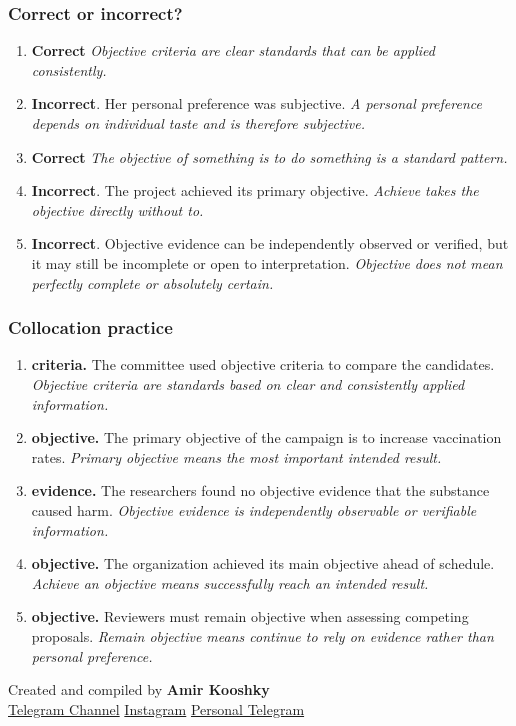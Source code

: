 \documentclass[11pt]{article}
\begin{document}
\subsubsection{Correct or incorrect?}
\begin{enumerate}
  \item \textbf{Correct} \emph{Objective criteria are clear standards that can be applied consistently.}
  \item \textbf{Incorrect}. Her personal preference was subjective. \emph{A personal preference depends on individual taste and is therefore subjective.}
  \item \textbf{Correct} \emph{The objective of something is to do something is a standard pattern.}
  \item \textbf{Incorrect}. The project achieved its primary objective. \emph{Achieve takes the objective directly without to.}
  \item \textbf{Incorrect}. Objective evidence can be independently observed or verified, but it may still be incomplete or open to interpretation. \emph{Objective does not mean perfectly complete or absolutely certain.}
\end{enumerate}

\subsubsection{Collocation practice}
\begin{enumerate}
  \item \textbf{criteria.} The committee used objective criteria to compare the candidates. \emph{Objective criteria are standards based on clear and consistently applied information.}
  \item \textbf{objective.} The primary objective of the campaign is to increase vaccination rates. \emph{Primary objective means the most important intended result.}
  \item \textbf{evidence.} The researchers found no objective evidence that the substance caused harm. \emph{Objective evidence is independently observable or verifiable information.}
  \item \textbf{objective.} The organization achieved its main objective ahead of schedule. \emph{Achieve an objective means successfully reach an intended result.}
  \item \textbf{objective.} Reviewers must remain objective when assessing competing proposals. \emph{Remain objective means continue to rely on evidence rather than personal preference.}
\end{enumerate}

\vfill
\begin{center}
\small\color{Muted} Created and compiled by \textbf{Amir Kooshky}\\
\href{https://t.me/KooshkyTOEFL}{Telegram Channel}\quad\textbullet\quad
\href{https://www.instagram.com/kooshkytoefl}{Instagram}\quad\textbullet\quad
\href{https://t.me/KooshkyTOEFL\_pv}{Personal Telegram}
\end{center}
\end{document}
